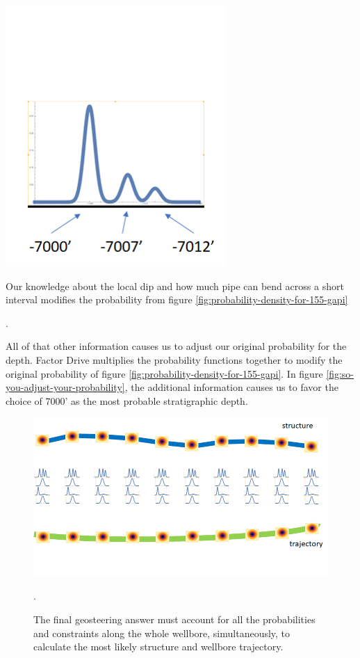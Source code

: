 \documentclass{tufte-handout}
\begin{document}
\begin{marginfigure}
  \includegraphics{so-you-adjust-your-probability.png}
   \caption{Our knowledge about the local dip and how much pipe can bend across a short interval 
  modifies the probability from figure \ref{fig:probability-density-for-155-gapi}}.
  \label{fig:so-you-adjust-your-probability}
\end{marginfigure}

All of that other information causes us to adjust our original probability for the 
depth. Factor Drive multiplies the probability functions together to modify the original
probability of figure \ref{fig:probability-density-for-155-gapi}. In figure \ref{fig:so-you-adjust-your-probability}, the additional information causes us to favor
the choice of 7000' as the most probable stratigraphic depth.

\begin{figure}[h]
    \includegraphics[width=\linewidth]{the-answer.png}
    \caption{
    The final geosteering answer must account for all the probabilities and constraints
    along the whole wellbore, simultaneously, to calculate the most likely structure and
    wellbore trajectory.
    }.
    \label{fig:the-answer}
\end{figure}
\end{document}
